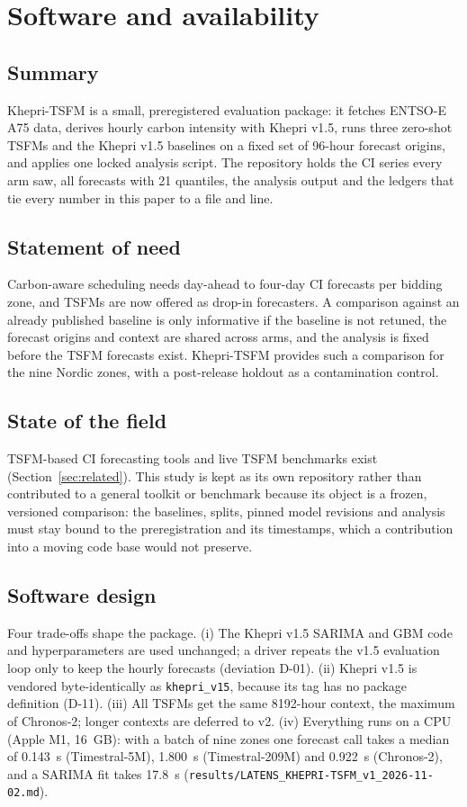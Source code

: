 \section{Software and availability}
\label{sec:software}

\subsection{Summary} Khepri-TSFM is a small, preregistered evaluation package: it fetches
ENTSO-E A75 data, derives hourly carbon intensity with Khepri v1.5, runs three zero-shot TSFMs
and the Khepri v1.5 baselines on a fixed set of 96-hour forecast origins, and applies one locked
analysis script. The repository holds the CI series every arm saw, all forecasts with 21
quantiles, the analysis output and the ledgers that tie every number in this paper to a file
and line.

\subsection{Statement of need} Carbon-aware scheduling needs day-ahead to four-day CI forecasts
per bidding zone, and TSFMs are now offered as drop-in forecasters. A comparison against an
already published baseline is only informative if the baseline is not retuned, the forecast
origins and context are shared across arms, and the analysis is fixed before the TSFM forecasts
exist. Khepri-TSFM provides such a comparison for the nine Nordic zones, with a post-release
holdout as a contamination control.

\subsection{State of the field} TSFM-based CI forecasting tools and live TSFM benchmarks exist
(Section~\ref{sec:related}). This study is kept as its own repository rather than contributed to
a general toolkit or benchmark because its object is a frozen, versioned comparison: the
baselines, splits, pinned model revisions and analysis must stay bound to the preregistration
and its timestamps, which a contribution into a moving code base would not preserve.

\subsection{Software design} Four trade-offs shape the package. (i) The Khepri v1.5 SARIMA and
GBM code and hyperparameters are used unchanged; a driver repeats the v1.5 evaluation loop only
to keep the hourly forecasts (deviation D-01). (ii) Khepri v1.5 is vendored byte-identically as
\texttt{khepri\_v15}, because its tag has no package definition (D-11). (iii) All TSFMs get the
same 8192-hour context, the maximum of Chronos-2; longer contexts are deferred to v2. (iv)
Everything runs on a CPU (Apple M1, 16~GB): with a batch of nine zones one forecast call takes a
median of 0.143~s (Timestral-5M), 1.800~s (Timestral-209M) and 0.922~s (Chronos-2), and a SARIMA
fit takes 17.8~s (\texttt{results/LATENS\_KHEPRI-TSFM\_v1\_2026-11-02.md}).

